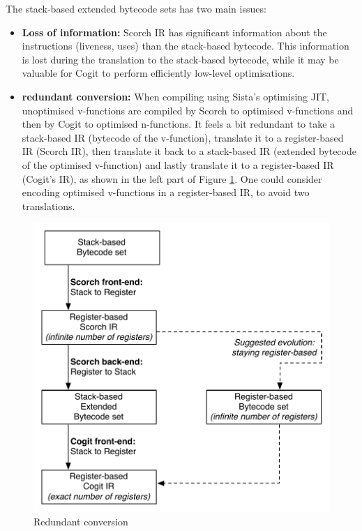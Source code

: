 \documentclass[a4paper,12pt,twoside]{../includes/ThesisStyle}
\begin{document}
The stack-based extended bytecode sets has two main issues:
\begin{itemize}
	\item \textbf{Loss of information:} Scorch IR has significant information about the instructions (liveness, uses) than the stack-based bytecode. This information is lost during the translation to the stack-based bytecode, while it may be valuable for Cogit to perform efficiently low-level optimisations.
	\item \textbf{redundant conversion:} When compiling using Sista's optimising JIT, unoptimised v-functions are compiled by Scorch to optimised v-functions and then by Cogit to optimised n-functions. It feels a bit redundant to take a stack-based IR (bytecode of the v-function), translate it to a register-based IR (Scorch IR), then translate it back to a stack-based IR (extended bytecode of the optimised v-function) and lastly translate it to a register-based IR (Cogit's IR), as shown in the left part of Figure \ref{fig:FutureWorkredundant}. One could consider encoding optimised v-functions in a register-based IR, to avoid two translations.
\end{itemize}

\begin{figure}[h!]
    \begin{center}
        \includegraphics[width=0.7\linewidth]{FutureWorkredondant}
        \caption{Redundant conversion}
        \label{fig:FutureWorkredundant}
    \end{center}
\end{figure}
\end{document}
